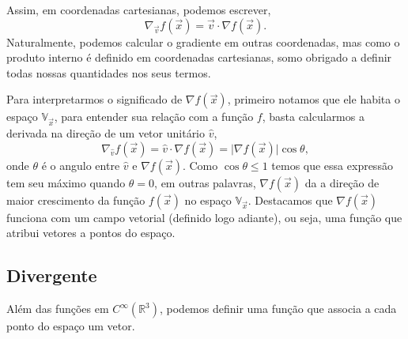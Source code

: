 Assim, em coordenadas cartesianas, podemos escrever,
\begin{equation}
	\nabla_{\vec{v}}f(\vec{x}) = \vec{v}\cdot\nabla f(\vec{x}).
\end{equation}
Naturalmente, podemos calcular o gradiente em outras coordenadas, mas como o
produto interno é definido em coordenadas cartesianas, somo obrigado a definir
todas nossas quantidades nos seus termos.

Para interpretarmos o significado de $\nabla f(\vec{x})$, primeiro notamos que
ele habita o espaço $\mathbb{V}_{\vec{x}}$, para entender sua relação com a
função $f$, basta calcularmos a derivada na direção de um vetor unitário
$\hat{v}$,
\begin{equation}
	\nabla_{\hat{v}}f(\vec{x}) = \hat{v}\cdot\nabla f(\vec{x}) = \vert\nabla f(\vec{x})\vert\cos\theta,
\end{equation}
onde $\theta$ é o angulo entre $\hat{v}$ e $\nabla f(\vec{x})$. Como
$\cos\theta\leq1$ temos que essa expressão tem seu máximo quando $\theta = 0$,
em outras palavras, $\nabla f(\vec{x})$ da a direção de maior crescimento da
função $f(\vec{x})$ no espaço $\mathbb{V}_{\vec{x}}$. Destacamos que $\nabla
	f(\vec{x})$ funciona com um campo vetorial (definido logo adiante), ou seja, uma
função que atribui vetores a pontos do espaço.

\subsection{Divergente}
\label{sec:div}

Além das funções em $C^\infty\left(\mathbb{R}^3\right)$, podemos definir uma
função que associa a cada ponto do espaço um vetor.


